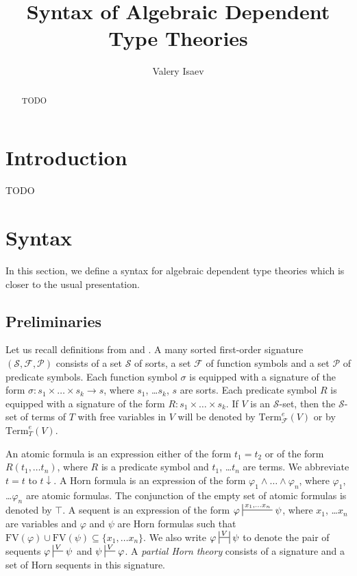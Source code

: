 \documentclass[reqno]{amsart}
\theoremstyle{definition}
\theoremstyle{remark}
\newcommand{\fs}[1]{\mathrm{#1}}
\newcommand{\Term}{\fs{Term}}
\newcommand{\FV}{\fs{FV}}
\numberwithin{figure}{section}
\begin{document}
\title{Syntax of Algebraic Dependent Type Theories}

\author{Valery Isaev}

\begin{abstract}
TODO
\end{abstract}

\maketitle

\section{Introduction}

TODO

\section{Syntax}

In this section, we define a syntax for algebraic dependent type theories which is closer to the usual presentation.

\subsection{Preliminaries}

Let us recall definitions from \cite{PHL} and \cite{alg-tt}.
A many sorted first-order signature $(\mathcal{S},\mathcal{F},\mathcal{P})$ consists of a set $\mathcal{S}$ of sorts,
a set $\mathcal{F}$ of function symbols and a set $\mathcal{P}$ of predicate symbols.
Each function symbol $\sigma$ is equipped with a signature of the form $\sigma : s_1 \times \ldots \times s_k \to s$, where $s_1$, \ldots $s_k$, $s$ are sorts.
Each predicate symbol $R$ is equipped with a signature of the form $R : s_1 \times \ldots \times s_k$.
If $V$ is an $\mathcal{S}$-set, then the $\mathcal{S}$-set of terms of $T$ with free variables in $V$ will be denoted by $\Term^e_\mathcal{F}(V)$ or by $\Term^e_T(V)$.

An atomic formula is an expression either of the form $t_1 = t_2$ or of the form $R(t_1, \ldots t_n)$,
where $R$ is a predicate symbol and $t_1$, \ldots $t_n$ are terms.
We abbreviate $t = t$ to $t\!\downarrow$.
A Horn formula is an expression of the form $\varphi_1 \land \ldots \land \varphi_n$, where $\varphi_1$, \ldots $\varphi_n$ are atomic formulas.
The conjunction of the empty set of atomic formulas is denoted by $\top$.
A sequent is an expression of the form $\varphi \sststile{}{x_1, \ldots x_n} \psi$, where $x_1$, \ldots $x_n$ are variables
and $\varphi$ and $\psi$ are Horn formulas such that $\FV(\varphi) \cup \FV(\psi) \subseteq \{ x_1, \ldots x_n \}$.
We also write $\varphi \ssststile{}{V} \psi$ to denote the pair of sequents $\varphi \sststile{}{V} \psi$ and $\psi \sststile{}{V} \varphi$.
A \emph{partial Horn theory} consists of a signature and a set of Horn sequents in this signature.
\end{document}
